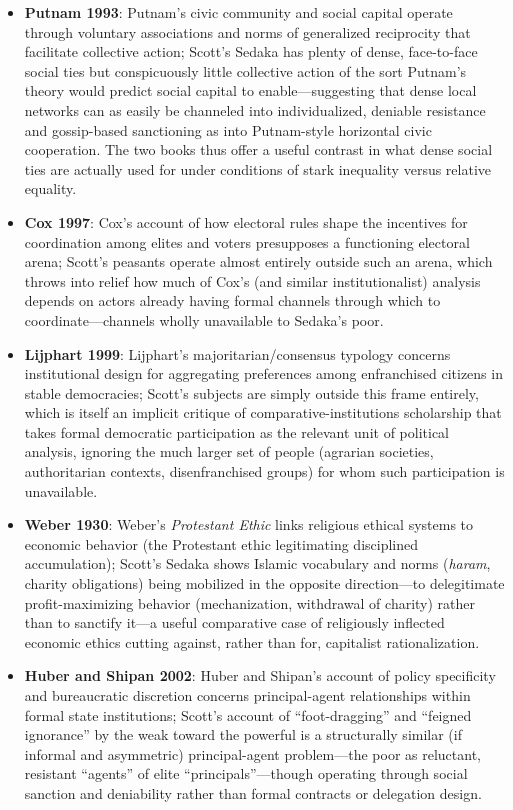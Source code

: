 \documentclass[12pt]{article}
\begin{document}
\begin{itemize}[leftmargin=*, itemsep=4pt]
    \item \textbf{Putnam 1993}: Putnam's civic community and social capital operate through voluntary associations and norms of generalized reciprocity that facilitate collective action; Scott's Sedaka has plenty of dense, face-to-face social ties but conspicuously little collective action of the sort Putnam's theory would predict social capital to enable---suggesting that dense local networks can as easily be channeled into individualized, deniable resistance and gossip-based sanctioning as into Putnam-style horizontal civic cooperation. The two books thus offer a useful contrast in what dense social ties are actually used for under conditions of stark inequality versus relative equality.
    \item \textbf{Cox 1997}: Cox's account of how electoral rules shape the incentives for coordination among elites and voters presupposes a functioning electoral arena; Scott's peasants operate almost entirely outside such an arena, which throws into relief how much of Cox's (and similar institutionalist) analysis depends on actors already having formal channels through which to coordinate---channels wholly unavailable to Sedaka's poor.
    \item \textbf{Lijphart 1999}: Lijphart's majoritarian/consensus typology concerns institutional design for aggregating preferences among enfranchised citizens in stable democracies; Scott's subjects are simply outside this frame entirely, which is itself an implicit critique of comparative-institutions scholarship that takes formal democratic participation as the relevant unit of political analysis, ignoring the much larger set of people (agrarian societies, authoritarian contexts, disenfranchised groups) for whom such participation is unavailable.
    \item \textbf{Weber 1930}: Weber's \textit{Protestant Ethic} links religious ethical systems to economic behavior (the Protestant ethic legitimating disciplined accumulation); Scott's Sedaka shows Islamic vocabulary and norms (\textit{haram}, charity obligations) being mobilized in the opposite direction---to delegitimate profit-maximizing behavior (mechanization, withdrawal of charity) rather than to sanctify it---a useful comparative case of religiously inflected economic ethics cutting against, rather than for, capitalist rationalization.
    \item \textbf{Huber and Shipan 2002}: Huber and Shipan's account of policy specificity and bureaucratic discretion concerns principal-agent relationships within formal state institutions; Scott's account of ``foot-dragging'' and ``feigned ignorance'' by the weak toward the powerful is a structurally similar (if informal and asymmetric) principal-agent problem---the poor as reluctant, resistant ``agents'' of elite ``principals''---though operating through social sanction and deniability rather than formal contracts or delegation design.

\end{itemize}
\end{document}
